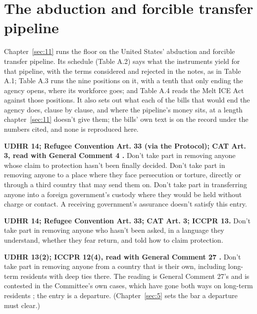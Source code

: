 \section{The abduction and forcible transfer pipeline}
\label{sec:A.3}
Chapter~\ref{sec:11} runs the floor on the United States' abduction and forcible transfer pipeline. Its schedule (Table A.2) says what the instruments yield for that pipeline, with the terms considered and rejected in the notes, as in Table A.1; Table A.3 runs the nine positions on it, with a tenth that only ending the agency opens, where its workforce goes; and Table A.4 reads the Melt ICE Act against those positions. It also sets out what each of the bills that would end the agency does, clause by clause, and where the pipeline's money sits, at a length chapter~\ref{sec:11} doesn't give them; the bills' own text is on the record under the numbers cited, and none is reproduced here.


\textbf{UDHR 14; Refugee Convention Art. 33 (via the Protocol); CAT Art. 3, read with General Comment 4 \autocite{cat2017gc4}.} Don't take part in removing anyone whose claim to protection hasn't been finally decided. Don't take part in removing anyone to a place where they face persecution or torture, directly or through a third country that may send them on. Don't take part in transferring anyone into a foreign government's custody where they would be held without charge or contact. A receiving government's assurance doesn't satisfy this entry.

\textbf{UDHR 14; Refugee Convention Art. 33; CAT Art. 3; ICCPR 13.} Don't take part in removing anyone who hasn't been asked, in a language they understand, whether they fear return, and told how to claim protection.

\textbf{UDHR 13(2); ICCPR 12(4), read with General Comment 27 \autocite{hrc1999gc27}.} Don't take part in removing anyone from a country that is their own, including long-term residents with deep ties there. The reading is General Comment 27's and is contested in the Committee's own cases, which have gone both ways on long-term residents \autocite{hrc1996stewart,hrc2011nystrom}; the entry is a departure. (Chapter~\ref{sec:5} sets the bar a departure must clear.)

